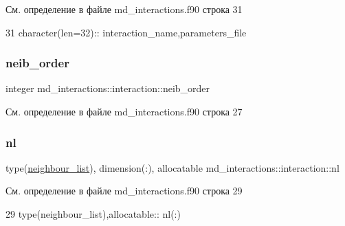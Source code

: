 См. определение в файле md\+\_\+interactions.\+f90 строка 31


\begin{DoxyCode}
31     \textcolor{keywordtype}{character(len=32)}:: interaction\_name,parameters\_file
\end{DoxyCode}
\mbox{\label{structmd__interactions_1_1interaction_a1650598e16e38fec2ea5bd093b7cc634}} 
\subsubsection{\texorpdfstring{neib\+\_\+order}{neib\_order}}
{\footnotesize\ttfamily integer md\+\_\+interactions\+::interaction\+::neib\+\_\+order}



См. определение в файле md\+\_\+interactions.\+f90 строка 27

\mbox{\label{structmd__interactions_1_1interaction_a43d6b246e83e0f832461d029fc922de6}} 
\subsubsection{\texorpdfstring{nl}{nl}}
{\footnotesize\ttfamily type(\mbox{\hyperlink{structmd__general_1_1neighbour__list}{neighbour\+\_\+list}}), dimension(\+:), allocatable md\+\_\+interactions\+::interaction\+::nl}



См. определение в файле md\+\_\+interactions.\+f90 строка 29


\begin{DoxyCode}
29     \textcolor{keywordtype}{type}(neighbour\_list),\textcolor{keywordtype}{allocatable}:: nl(:)
\end{DoxyCode}
\mbox{\label{structmd__interactions_1_1interaction_a45da5fb326e67bc08da38f1cc7b5ff2e}} 

